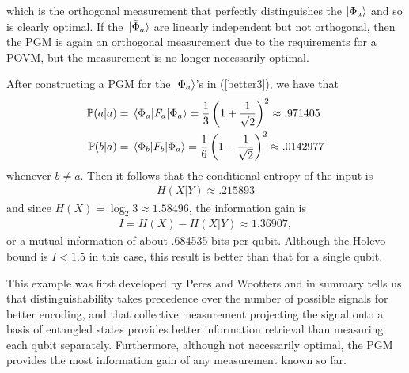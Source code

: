 \documentclass[a4paper, 12pt]{article}
\numberwithin{equation}{section}
\numberwithin{figure}{section}
\theoremstyle{definition}
\begin{document}
    which is the orthogonal measurement that perfectly distinguishes the $\ket{\Phi_a}$ and so is clearly optimal. If the $\ket*{\tilde{\Phi}_a}$ are linearly independent but not orthogonal, then the PGM is again an orthogonal measurement due to the requirements for a POVM, but the measurement is no longer necessarily optimal. \par
    After constructing a PGM for the $\ket{\Phi_a}$'s in (\ref{better3}), we have that
    \begin{align}
        \mathbb{P}(a | a) &= \matrixel{\Phi_a}{F_a}{\Phi_a} = \frac{1}{3} \left( 1 + \frac{1}{\sqrt{2}} \right)^2 \approx .971405 \\
        \mathbb{P}(b | a) &= \matrixel{\Phi_b}{F_b}{\Phi_a} = \frac{1}{6} \left( 1 - \frac{1}{\sqrt{2}} \right)^2 \approx .0142977
    \end{align}
    whenever $b \neq a$. Then it follows that the conditional entropy of the input is
    \begin{align}
        H(X | Y) \approx .215893
    \end{align}
    and since $H(X) = \log_2 3 \approx 1.58496$, the information gain is
    \begin{align}
        I = H(X) - H(X | Y) \approx 1.36907,
    \end{align}
    or a mutual information of about .684535 bits per qubit. Although the Holevo bound is $I < 1.5$ in this case, this result is better than that for a single qubit. \par
    This example was first developed by Peres and Wootters and in summary tells us that distinguishability takes precedence over the number of possible signals for better encoding, and that collective measurement projecting the signal onto a basis of entangled states provides better information retrieval than measuring each qubit separately. Furthermore, although not necessarily optimal, the PGM provides the most information gain of any measurement known so far.
\end{document}
